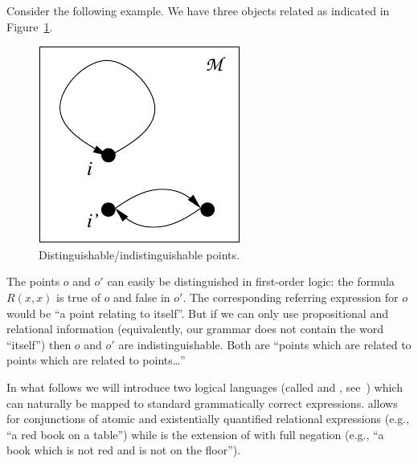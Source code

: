 Consider the following example.  We have three objects related as indicated in
Figure~\ref{fig-car1}.
\begin{figure}
\begin{center}
\includegraphics[scale=.8]{pic.pdf}
\end{center}
\caption{Distinguishable/indistinguishable points.}\label{fig-car1}
\end{figure}
%
The points $o$ and $o'$ can easily be distinguished in first-order logic:
the formula $R(x,x)$ is true of $o$ and false in $o'$. The corresponding
referring expression for $o$ would be ``a point relating to itself''.
But if we can only use propositional and relational information (equivalently, our grammar does not contain the word ``itself'') then $o$ and $o'$ are indistinguishable. Both
are ``points which are related to points which are related to points\ldots''

In what follows we will introduce two logical languages (called \el and \alc, see~\cite{handbook}) which can naturally be mapped to standard grammatically correct expressions.  \el allows
for conjunctions of atomic and existentially quantified relational expressions (e.g.,
``a red book on a table'') while \alc is the extension of \el with full negation
(e.g., ``a book which is not red and is not on the floor'').

